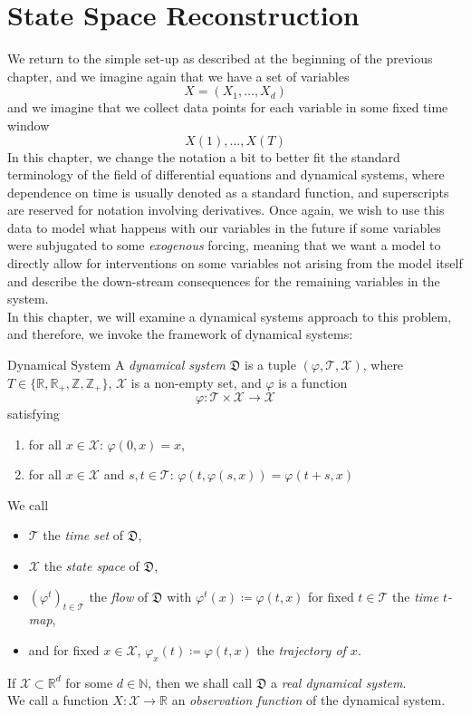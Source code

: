 \documentclass[11pt, a4paper]{memoir}
\theoremstyle{break}
\theoremstyle{break}
\theoremstyle{nonumberplain}
\newcommand{\mN}{\mathbb{N}}
\newcommand{\mZ}{\mathbb{Z}}
\newcommand{\mR}{\mathbb{R}}
\begin{document}
\chapter{State Space Reconstruction}
We return to the simple set-up as described at the beginning of the previous chapter, and we imagine again that we have a set of variables
$$X=(X_1,\ldots, X_d)$$
and we imagine that we collect data points for each variable in some fixed time window 
$$X(1),\ldots, X(T)$$
In this chapter, we change the notation a bit to better fit the standard terminology of the field of differential equations and dynamical systems, where dependence on time is usually denoted as a standard function, and superscripts are reserved for notation involving derivatives. Once again, we wish to use this data to model what happens with our variables in the future if some variables were subjugated to some \emph{exogenous} forcing, meaning that we want a model to directly allow for interventions on some variables not arising from the model itself and describe the down-stream consequences for the remaining variables in the system.\\[5pt]
In this chapter, we will examine a dynamical systems approach to this problem, and therefore, we invoke the framework of dynamical systems:
\begin{mydefinition}{Dynamical System}
A \emph{dynamical system} $\mathfrak{D}$ is a tuple $(\varphi, \mathcal{T},\mathcal{X})$, where $T\in \{\mR,\mR_+,\mZ,\mZ_+\}$, $\mathcal{X}$ is a non-empty set, and $\varphi$ is a function
$$\varphi: \mathcal{T}\times \mathcal{X}\to \mathcal{X}$$
satisfying
\begin{enumerate}[label=(\roman*)]
	\item for all $x\in \mathcal{X}$: $\varphi(0,x)=x$,
	\item for all $x\in \mathcal{X}$ and $s,t \in \mathcal{T}$: $\varphi(t,\varphi(s,x))=\varphi(t+s,x)$
\end{enumerate}
We call 
\begin{itemize}
\item $\mathcal{T}$ the \emph{time set} of $\mathfrak{D}$, 
\item $\mathcal{X}$ the \emph{state space} of $\mathfrak{D}$, 
\item $(\varphi^t)_{t\in \mathcal{T}}$ the \emph{flow} of $\mathfrak{D}$ with
$\varphi^t(x)\coloneqq \varphi(t,x)$ for fixed $t\in \mathcal{T}$ the \emph{time $t$-map},
\item and for fixed $x\in \mathcal{X}$, $\varphi_x(t)\coloneqq \varphi(t,x)$ the \emph{trajectory of $x$}.
\end{itemize}
If $\mathcal{X}\subset \mR^d$ for some $d\in \mN$, then we shall call $\mathfrak{D}$ a \emph{real dynamical system}.\\[5pt]
We call a function $X:\mathcal{X}\to\mR$ an \emph{observation function} of the dynamical system.
\end{mydefinition}
\end{document}
